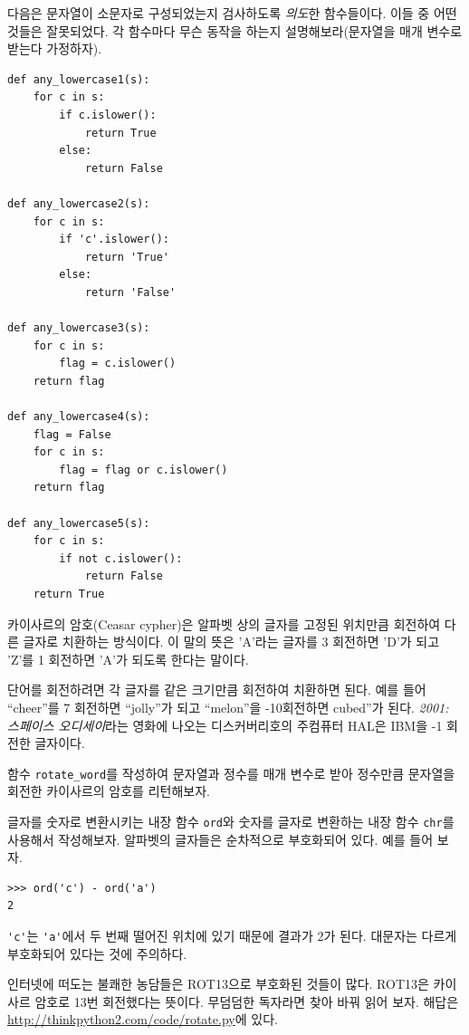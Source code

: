 \documentclass[10pt]{book}
\begin{document}
\begin{exercise}

  다음은 문자열이 소문자로 구성되었는지 검사하도록 {\em 의도}한
  함수들이다.  이들 중 어떤 것들은 잘못되었다.  각 함수마다 무슨 동작을
  하는지 설명해보라(문자열을 매개 변수로 받는다 가정하자).

\begin{verbatim}
def any_lowercase1(s):
    for c in s:
        if c.islower():
            return True
        else:
            return False

def any_lowercase2(s):
    for c in s:
        if 'c'.islower():
            return 'True'
        else:
            return 'False'

def any_lowercase3(s):
    for c in s:
        flag = c.islower()
    return flag

def any_lowercase4(s):
    flag = False
    for c in s:
        flag = flag or c.islower()
    return flag

def any_lowercase5(s):
    for c in s:
        if not c.islower():
            return False
    return True
\end{verbatim}

\end{exercise}


\begin{exercise}

\label{exrotate}
카이사르의 암호(Ceasar cypher)은 알파벳 상의 글자를 고정된 위치만큼 회전하여 다른 글자로 치환하는 방식이다. 이 말의 뜻은 'A'라는 글자를 3 회전하면 'D'가 되고 'Z'를 1 회전하면 'A'가 되도록 한다는 말이다. 

단어를 회전하려면 각 글자를 같은 크기만큼 회전하여 치환하면 된다.  예를
들어 ``cheer''를 7 회전하면 ``jolly''가 되고 ``melon''을 -10회전하면
cubed''가 된다.  {\em 2001: 스페이스 오디세이}라는 영화에 나오는
디스커버리호의 주컴퓨터 HAL은 IBM을 -1 회전한 글자이다.


함수 \verb"rotate_word"를 작성하여 문자열과 정수를 매개 변수로 받아
정수만큼 문자열을 회전한 카이사르의 암호를 리턴해보자.

글자를 숫자로 변환시키는 내장 함수 {\tt ord}와 숫자를 글자로 변환하는 내장 함수 {\tt chr}를 사용해서 작성해보자.  알파벳의 글자들은 순차적으로 부호화되어 있다.  예를 들어 보자. 

\begin{verbatim}
>>> ord('c') - ord('a')
2
\end{verbatim}

\verb"'c'"는 \verb"'a'"에서 두 번째 떨어진 위치에 있기 때문에 결과가
2가 된다.  대문자는 다르게 부호화되어 있다는 것에 주의하다.

인터넷에 떠도는 불쾌한 농담들은 ROT13으로 부호화된 것들이 많다.
ROT13은 카이사르 암호로 13번 회전했다는 뜻이다.  무덤덤한 독자라면 찾아
바꿔 읽어 보자.  해답은 \url{http://thinkpython2.com/code/rotate.py}에
있다.

\end{exercise}
\end{document}
